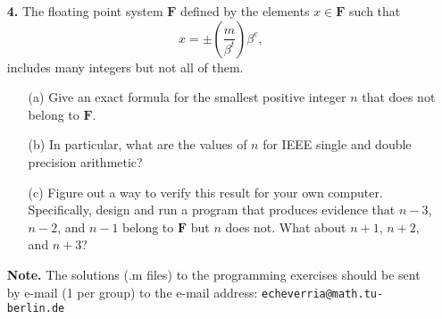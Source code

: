 \documentclass[10pt]{report}
\begin{document}
\begin{enumerate}
\item[\textbf{4.}] The floating point system $\mathbf{F}$ defined by the elements $x\in\mathbf{F}$ such that \[x=\pm\left(\frac{m}{\beta^t}\right)\beta^e,\] includes many integers but not all of them.
  \begin{enumerate}
    \item[(a)] Give an exact formula for the smallest positive integer $n$ that does not belong to $\mathbf{F}$.
    \item[(b)] In particular, what are the values of $n$ for IEEE single and double precision arithmetic?
    \item[(c)] Figure out a way to verify this result for your own computer. Specifically, design and run a program that produces evidence that $n-3$, $n-2$, and $n-1$ belong to $\mathbf{F}$ but $n$ does not. What about $n+1$, $n+2$, and $n+3$?
    \end{enumerate}


\item[\textbf{Note.}] The solutions (.m files) to the programming exercises should be sent by e-mail (1 per group) to the e-mail address: \verb+echeverria@math.tu-berlin.de+ \\


\end{enumerate}
\end{document}

